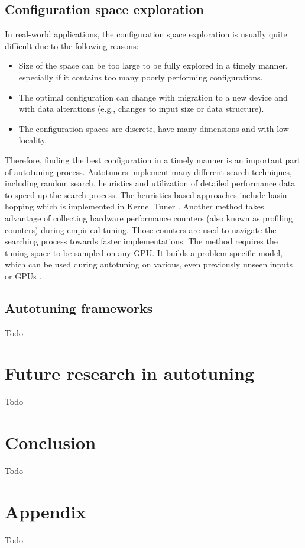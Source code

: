 \documentclass[
  digital,     %
  oneside,     %
  nosansbold,  %
  nocolorbold, %
  lof,         %
  lot,         %
  nocover
]{fithesis4}
\begin{document}
\section{Configuration space exploration}
In real-world applications, the configuration space exploration is usually quite difficult due to the following reasons:

\begin{itemize}
	\item Size of the space can be too large to be fully explored in a timely manner, especially if it contains too many poorly performing configurations.
	\item The optimal configuration can change with migration to a new device and with data alterations (e.g., changes to input size or data structure).
	\item The configuration spaces are discrete, have many dimensions and with low locality.
\end{itemize}

Therefore, finding the best configuration in a timely manner is an important part of autotuning process. Autotuners implement many different search techniques, including random search, heuristics and utilization of detailed performance data to speed up the search process. The heuristics-based approaches include basin hopping which is implemented in Kernel Tuner \cite{vanwerkhoven2018kernel}. Another method takes advantage of collecting hardware performance counters (also known as profiling counters) during empirical tuning. Those counters are used to navigate the searching process towards faster implementations. The method requires the tuning space to be sampled on any GPU. It builds a problem-specific model, which can be used during autotuning on various, even previously unseen inputs or GPUs \cite{filipovic2022using}.

\section{Autotuning frameworks}
Todo

\chapter{Future research in autotuning}
Todo

\chapter{Conclusion}
Todo

\nocite{*}
\printbibliography[heading=bibintoc]

\appendix
\chapter{Appendix}
Todo
\end{document}
